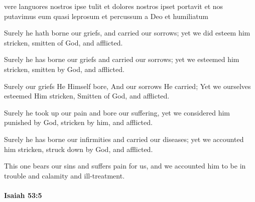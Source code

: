 			\begin{framed}
			\scriptsize
				\begin{compactdesc}
					\item[BHS] 
					\item[LXX] 
					\item[BSV] vere languores nostros ipse tulit et dolores nostros ipset portavit et nos putavimus eum quasi leprosum et percussum a Deo et humiliatum
					\item[ASV] Surely he hath borne our griefs, and carried our sorrows; yet we did esteem him stricken, smitten of God, and afflicted.
					\item[ESV] Surely he has borne our griefs and carried our sorrows; yet we esteemed him stricken, smitten by God, and afflicted.
					\item[NASB] Surely our griefs He Himself bore, And our sorrows He carried; Yet we ourselves esteemed Him stricken, Smitten of God, and afflicted.
					\item[NIV] Surely he took up our pain and bore our suffering, yet we considered him punished by God, stricken by him, and afflicted.
					\item[NRSV] Surely he has borne our infirmities and carried our diseases; yet we accounted him stricken, struck down by God, and afflicted.
					\item[NETS] This one bears our sins and suffers pain for us, and we accounted him to be in trouble and calamity and ill-treatment.
				\end{compactdesc}
			\end{framed}

		\paragraph{Isaiah 53:5} %
			\label{ISAIAH-53-5}

